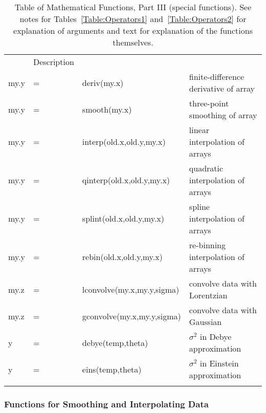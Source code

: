 \begin{table}[t]
 \begin{center}
{}
  \caption[a]{Table of Mathematical Functions, Part III (special
    functions).  See notes for Tables~{\ref{Table:Operators1}}
    and~{\ref{Table:Operators2}} for explanation of arguments and text for
    explanation of the functions themselves.
    \smallskip } {\label{Table:Operators3}}
  \begin{tabular}{llll}
    \noalign{\smallskip}%
    \multicolumn{3}{l}{Function Prototype} & Description  \\ 
 \noalign{\smallskip}    \hline    \noalign{\smallskip}    
    my.y&=&  deriv(my.x)                & finite-difference derivative of array\\
    my.y&=&  smooth(my.x)               & three-point smoothing of array\\
    my.y&=&  interp(old.x,old.y,my.x)   & linear interpolation of arrays\\
    my.y&=&  qinterp(old.x,old.y,my.x)  & quadratic interpolation of arrays \\
    my.y&=&  splint(old.x,old.y,my.x)   & spline interpolation of arrays\\ 
    my.y&=&  rebin(old.x,old.y,my.x)    & re-binning interpolation of arrays\\ 
    \noalign{\smallskip}
    my.z   &=&  lconvolve(my.x,my.y,sigma)   & convolve data with Lorentzian \\
    my.z   &=&  gconvolve(my.x,my.y,sigma)   & convolve data with Gaussian  \\
    \noalign{\smallskip}
    y   &=&  debye(temp,theta) & $\sigma^2$ in Debye approximation\\
    y   &=&  eins(temp,theta)  & $\sigma^2$ in Einstein approximation\\
    \noalign{\smallskip}    \hline
  \end{tabular}
 \end{center}
\end{table} 

\subsubsection{Functions for Smoothing and Interpolating Data}


